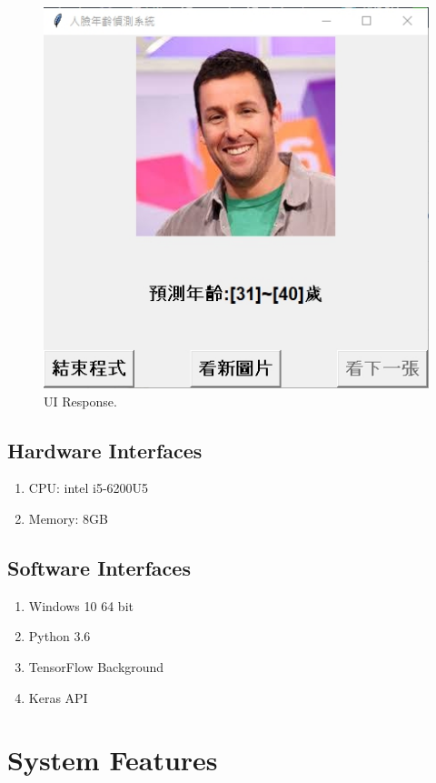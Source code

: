 \documentclass{scrreprt}
\begin{document}
\begin{CJK}{UTF8}{bkai}
\begin{enumerate}
\begin{figure}[htb]
\begin{center}
            \includegraphics[scale=0.8]{image/UiResponse.png}%
        \end{center}
        \caption{UI Response.}
        \label{fig:3}
    \end{figure}
\end{enumerate}

\section{Hardware Interfaces}
\begin{enumerate}
    \item CPU: intel i5-6200U5
    \item Memory: 8GB
\end{enumerate}

\section{Software Interfaces}
\begin{enumerate}
    \item Windows 10 64 bit
    \item Python 3.6
    \item TensorFlow Background
    \item Keras API
\end{enumerate} 

\chapter{System Features}

\end{CJK}
\end{document}
